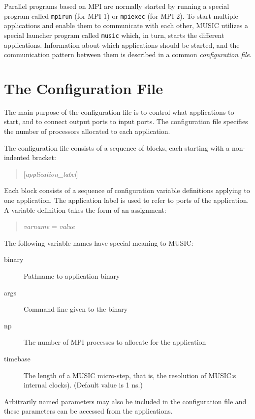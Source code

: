 \documentclass[a4paper]{report}
\begin{document}
Parallel programs based on MPI are normally started by running a
special program called \texttt{mpirun} (for MPI-1) or
\texttt{mpiexec} (for MPI-2).  To start multiple
applications and enable them to communicate with each other, MUSIC
utilizes a special launcher program called \texttt{music}
which, in turn, starts the different applications.  Information about
which applications should be started, and the communication pattern
between them is described in a common \emph{configuration
  file}.


\section{The Configuration File}

The main purpose of the configuration file is to control what
applications to start, and to connect output ports to input ports.
The configuration file specifies the number of processors allocated to
each application.

The configuration file consists of a sequence of blocks, each starting
with a non-indented bracket:

\begin{quote}
  [\emph{application\_label}]
\end{quote}

\noindent Each block consists of a sequence of configuration variable
definitions applying to one application.  The application label is
used to refer to ports of the application.  A variable definition
takes the form of an assignment:

\begin{quote}
  \emph{varname} = \emph{value}
\end{quote}

The following variable names have special meaning to MUSIC:
\begin{description}
  \item[binary] Pathname to application binary
  \item[args] Command line given to the binary
  \item[np] The number of MPI processes to allocate for the application
  \item[timebase] The length of a MUSIC micro-step, that is, the
    resolution of MUSIC:s internal clocks).  (Default value is 1 ns.)
\end{description}
Arbitrarily named parameters may also be included in the configuration
file and these parameters can be accessed from the applications.
\end{document}
